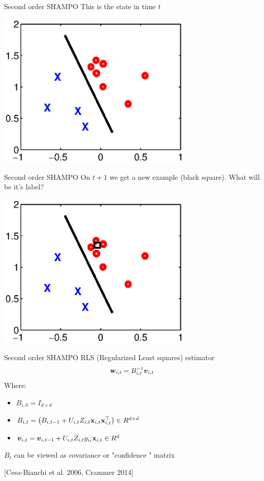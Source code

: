 \documentclass{beamer}
\begin{document}
\begin{frame}{Second order SHAMPO}
This is the state in time $t$
\begin{center}
\includegraphics[width=0.7\textwidth]{figs/confidence.eps}
\end{center}
\end{frame}

\begin{frame}{Second order SHAMPO}
On $t+1$ we get a new example (black square). What will be it's label?
\begin{center}
\includegraphics[width=0.7\textwidth]{figs/confidence2.eps}
\end{center}
\end{frame}

\begin{frame}{Second order SHAMPO}
RLS (Regularized Least squares) estimator
\begin{equation*}
\mathbf{w}_{i,t}=B_{i,t}^{-1}{\boldsymbol{v}}_{i,t}
\end{equation*}
Where:\newline
\begin{itemize}
\item $B_{i,0}=I_{d\times d}$\newline
\item $B_{i,t}=\left({B_{i,t-1}+ U_{i,t}Z_{i,t}\mathbf{x}_{i,t} {\mathbf{x}}^{\top}_{i,t}}\right)\in R^{d\times d}$\newline
\item ${\boldsymbol{v}}_{i,t}={\boldsymbol{v}}_{i,t-1}+U_{i,t}Z_{i,t}y_{i_t}\mathbf{x}_{i,t}\in R^d$ \newline
\end{itemize}
$B_t$ can be viewed as covariance or "confidence " matrix\newline

 [Cesa-Bianchi et al. 2006, Crammer  2014]
\end{frame}
\end{document}
